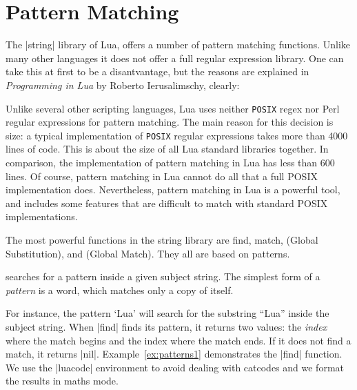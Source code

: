 

\chapter{Pattern Matching}

The |string| library of Lua, offers a number of pattern matching functions. Unlike many other languages it does not offer a full regular expression library. One can take this at first to be a disantvantage, but the reasons are explained in \textit{Programming in Lua} by Roberto Ierusalimschy, clearly:

\begin{latexquotation}
Unlike several other scripting languages, Lua uses neither \texttt{POSIX} regex nor
Perl regular expressions for pattern matching. The main reason for this decision
is size: a typical implementation of \texttt{POSIX} regular expressions takes more than
4000 lines of code. This is about the size of all Lua standard libraries together.
In comparison, the implementation of pattern matching in Lua has less than
600 lines. Of course, pattern matching in Lua cannot do all that a full POSIX
implementation does. Nevertheless, pattern matching in Lua is a powerful tool,
and includes some features that are difficult to match with standard POSIX
implementations.
\end{latexquotation}

The most powerful functions in the string library are find, match,  (Global
Substitution), and  (Global Match). They all are based on patterns.


searches for a pattern inside a given subject string. The simplest form of a \textit{pattern} is a word, which matches only a copy of itself.

For instance, the pattern ‘Lua’ will search for the substring “Lua” inside the
subject string. When |find| finds its pattern, it returns two values: the \textit{index} where the match begins and the index where the match ends. If it does not find a match, it returns |nil|. Example~\ref{ex:patterns1} demonstrates the |find| function. We use the |luacode| environment to avoid dealing with catcodes and we format the results in maths mode.


